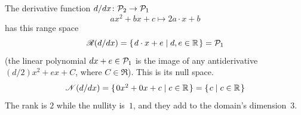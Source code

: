 \begin{frame}
\ex
The derivative function $\mbox{$d/dx\colon \mathcal{P}_2\to \mathcal{P}_1$}$
\begin{equation*}
  ax^2+bx+c \mapsto 2a\cdot x+b
\end{equation*}
has this range space
\begin{equation*}
  \mathscr{R}(d/dx)=\mbox{$\{\hspace{0.1em}d\cdot x+e\mid d, e\in\mathbb{R}\hspace{0.1em}\}$}=\mathcal{P}_{1}
\end{equation*}
(the linear polynomial $dx+e\in\mathcal{P}_{1}$ 
is the image of any antiderivative $(d/2)x^2+ex+C$, where $C\in \Re$).
This is its null space.
\begin{equation*}
  \mathscr{N}(d/dx)=\mbox{$\{\hspace{0.1em}0x^2+0x+c \mid c\in\mathbb{R}\hspace{0.1em}\}$}=\mbox{$\{\hspace{0.1em}c \mid c\in\mathbb{R}\hspace{0.1em}\}$}
\end{equation*}
The rank is $2$ while the nullity is~$1$, and they add to the domain's 
dimension~$3$.
\end{frame}
